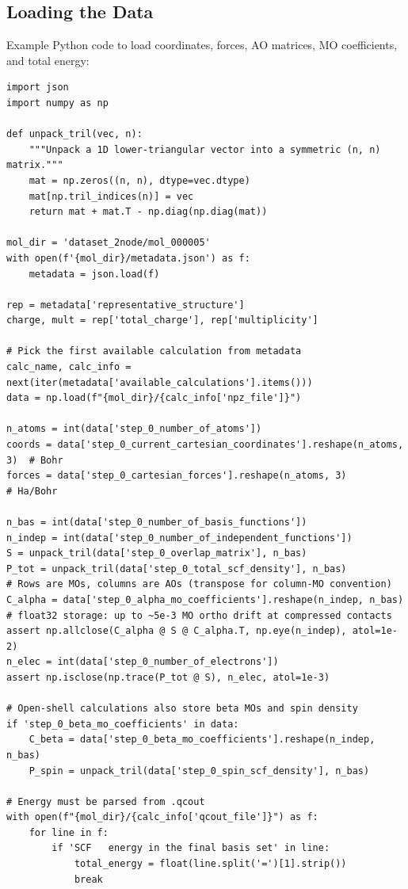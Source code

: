 \documentclass[fleqn,10pt]{article}
\begin{document}
\subsection*{Loading the Data}

Example Python code to load coordinates, forces, AO matrices, MO coefficients, and total energy:

\begin{verbatim}
import json
import numpy as np

def unpack_tril(vec, n):
    """Unpack a 1D lower-triangular vector into a symmetric (n, n) matrix."""
    mat = np.zeros((n, n), dtype=vec.dtype)
    mat[np.tril_indices(n)] = vec
    return mat + mat.T - np.diag(np.diag(mat))

mol_dir = 'dataset_2node/mol_000005'
with open(f'{mol_dir}/metadata.json') as f:
    metadata = json.load(f)

rep = metadata['representative_structure']
charge, mult = rep['total_charge'], rep['multiplicity']

# Pick the first available calculation from metadata
calc_name, calc_info = next(iter(metadata['available_calculations'].items()))
data = np.load(f"{mol_dir}/{calc_info['npz_file']}")

n_atoms = int(data['step_0_number_of_atoms'])
coords = data['step_0_current_cartesian_coordinates'].reshape(n_atoms, 3)  # Bohr
forces = data['step_0_cartesian_forces'].reshape(n_atoms, 3)              # Ha/Bohr

n_bas = int(data['step_0_number_of_basis_functions'])
n_indep = int(data['step_0_number_of_independent_functions'])
S = unpack_tril(data['step_0_overlap_matrix'], n_bas)
P_tot = unpack_tril(data['step_0_total_scf_density'], n_bas)
# Rows are MOs, columns are AOs (transpose for column-MO convention)
C_alpha = data['step_0_alpha_mo_coefficients'].reshape(n_indep, n_bas)
# float32 storage: up to ~5e-3 MO ortho drift at compressed contacts
assert np.allclose(C_alpha @ S @ C_alpha.T, np.eye(n_indep), atol=1e-2)
n_elec = int(data['step_0_number_of_electrons'])
assert np.isclose(np.trace(P_tot @ S), n_elec, atol=1e-3)

# Open-shell calculations also store beta MOs and spin density
if 'step_0_beta_mo_coefficients' in data:
    C_beta = data['step_0_beta_mo_coefficients'].reshape(n_indep, n_bas)
    P_spin = unpack_tril(data['step_0_spin_scf_density'], n_bas)

# Energy must be parsed from .qcout
with open(f"{mol_dir}/{calc_info['qcout_file']}") as f:
    for line in f:
        if 'SCF   energy in the final basis set' in line:
            total_energy = float(line.split('=')[1].strip())
            break
\end{verbatim}
\end{document}
